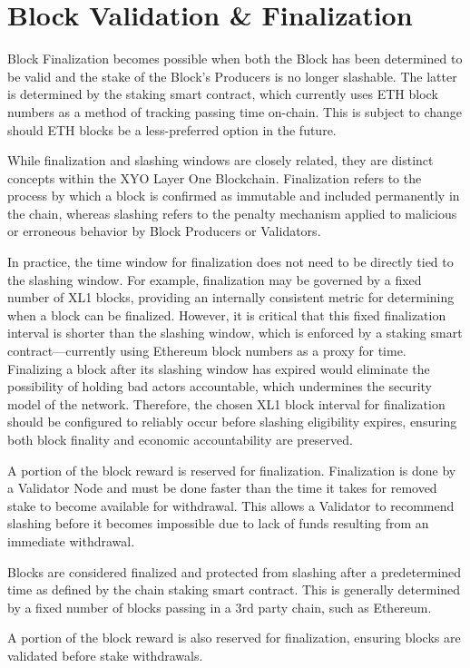 \documentclass{article}
\begin{document}
\section{Block Validation \& Finalization}
Block Finalization becomes possible when both the Block has been determined to be valid and the stake of the Block's Producers is no longer slashable. The latter is determined by the staking smart contract, which currently uses ETH block numbers as a method of tracking passing time on-chain. This is subject to change should ETH blocks be a less-preferred option in the future.

While finalization and slashing windows are closely related, they are distinct concepts within the XYO Layer One Blockchain. Finalization refers to the process by which a block is confirmed as immutable and included permanently in the chain, whereas slashing refers to the penalty mechanism applied to malicious or erroneous behavior by Block Producers or Validators.

In practice, the time window for finalization does not need to be directly tied to the slashing window. For example, finalization may be governed by a fixed number of XL1 blocks, providing an internally consistent metric for determining when a block can be finalized. However, it is critical that this fixed finalization interval is shorter than the slashing window, which is enforced by a staking smart contract—currently using Ethereum block numbers as a proxy for time. Finalizing a block after its slashing window has expired would eliminate the possibility of holding bad actors accountable, which undermines the security model of the network. Therefore, the chosen XL1 block interval for finalization should be configured to reliably occur before slashing eligibility expires, ensuring both block finality and economic accountability are preserved.

A portion of the block reward is reserved for finalization. Finalization is done by a Validator Node and must be done faster than the time it takes for removed stake to become available for withdrawal. This allows a Validator to recommend slashing before it becomes impossible due to lack of funds resulting from an immediate withdrawal. 

Blocks are considered finalized and protected from slashing after a predetermined time as defined by the chain staking smart contract. This is generally determined by a fixed number of blocks passing in a 3rd party chain, such as Ethereum.

A portion of the block reward is also reserved for finalization, ensuring blocks are validated before stake withdrawals. 
\end{document}

